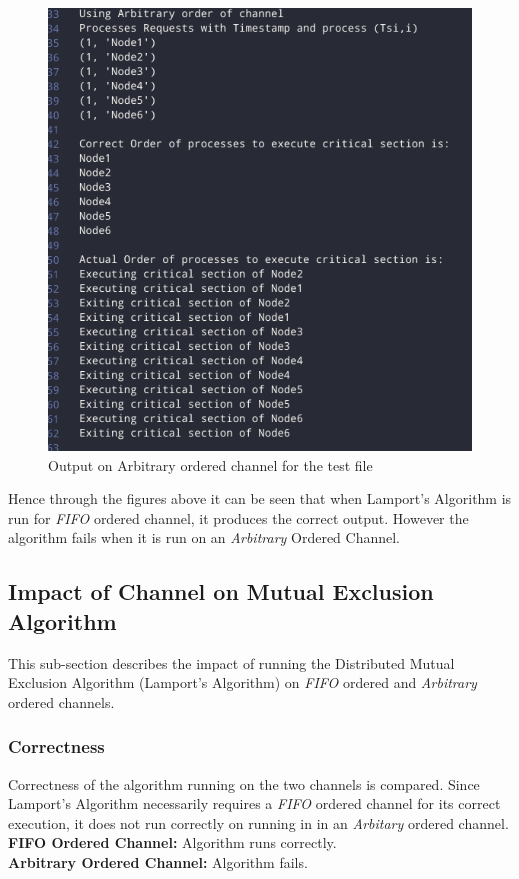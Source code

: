 \documentclass[a4paper, 12pt]{article}
\begin{document}
				\begin{figure}[H]
				\includegraphics[width=\linewidth]{ME_Arbitrary.png}
				\caption{Output on Arbitrary ordered channel for the test file}
				\label{MEResA}
			\end{figure}
		
		Hence through the figures above it can be seen that when Lamport's Algorithm is run for \textit{FIFO} ordered channel, it produces the correct output. However the algorithm fails when it is run on an \textit{Arbitrary} Ordered Channel.
		
		\subsection{Impact of Channel on Mutual Exclusion Algorithm}
			This sub-section describes the impact of running the Distributed Mutual Exclusion Algorithm (Lamport's Algorithm) on \textit{FIFO} ordered and \textit{Arbitrary} ordered channels.
			
			\subsubsection{Correctness}
				Correctness of the algorithm running on the two channels is compared. Since Lamport's Algorithm necessarily requires a \textit{FIFO} ordered channel for its correct execution, it does not run correctly on running in in an \textit{Arbitary} ordered channel.\\
				\indent \textbf{FIFO Ordered Channel:} Algorithm runs correctly. \\
				\indent \textbf{Arbitrary Ordered Channel:} Algorithm fails.
			
\end{document}
